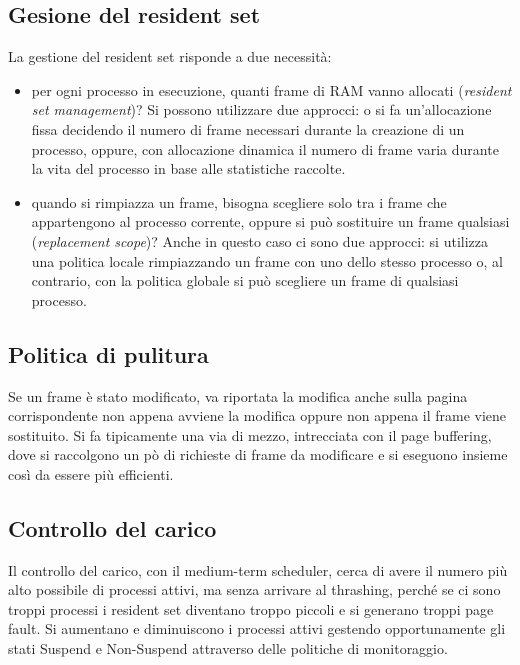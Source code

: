 \subsection*{Gesione del resident set}
La gestione del resident set risponde a due necessità: 
\begin{itemize}
    \item per ogni processo in esecuzione, quanti frame di RAM vanno allocati (\textit{resident set management})? Si possono utilizzare due approcci: o si fa un'allocazione fissa decidendo il numero di frame necessari durante la creazione di un processo, oppure, con allocazione dinamica il numero di frame varia durante la vita del processo in base alle statistiche raccolte.
    \item quando si rimpiazza un frame, bisogna scegliere solo tra i frame che appartengono al processo corrente, oppure si può sostituire un frame qualsiasi (\textit{replacement scope})? Anche in questo caso ci sono due approcci: si utilizza una politica locale rimpiazzando un frame con uno dello stesso processo o, al contrario, con la politica globale si può scegliere un frame di qualsiasi processo.
\end{itemize}

\subsection*{Politica di pulitura}
Se un frame è stato modificato, va riportata la modifica anche sulla pagina corrispondente non appena avviene la modifica oppure non appena il frame viene sostituito. Si fa tipicamente una via di mezzo, intrecciata con il page buffering, dove si raccolgono un pò di richieste di frame da modificare e si eseguono insieme così da essere più efficienti.

\subsection*{Controllo del carico}
Il controllo del carico, con il medium-term scheduler, cerca di avere il numero più alto possibile di processi attivi, ma senza arrivare al thrashing, perché se ci sono troppi processi i resident set diventano troppo piccoli e si generano troppi page fault. Si aumentano e diminuiscono i processi attivi gestendo opportunamente gli stati Suspend e Non-Suspend attraverso delle politiche di monitoraggio.

